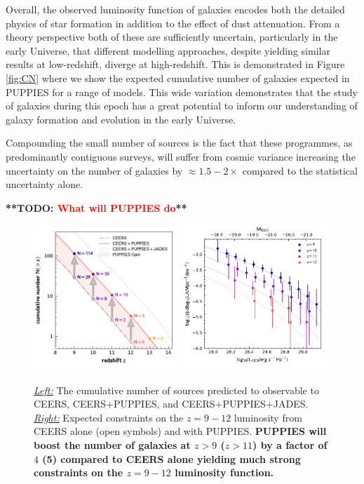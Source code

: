 \documentclass[12pt]{article}
\newcommand{\todo}[1]{\textbf{**TODO: \textcolor{red}{#1}**}}
\begin{document}
Overall, the observed luminosity function of galaxies encodes both the  detailed physics of star formation in addition to the effect of dust attenuation. From a theory perspective both of these are sufficiently uncertain, particularly in the early Universe, that different modelling approaches, despite yielding similar results at low-redshift, diverge at high-redshift. This is demonstrated in Figure \ref{fig:CN} where we show the expected cumulative number of galaxies expected in PUPPIES for a range of models. This wide variation demonstrates that the study of galaxies during this epoch has a great potential to inform our understanding of galaxy formation and evolution in the early Universe.


Compounding the small number of sources is the fact that these programmes, as predominantly contiguous surveys, will suffer from cosmic variance increasing the uncertainty on the number of galaxies by $\approx 1.5-2\times$ compared to the statistical uncertainty alone\cite{2020MNRAS.499.2401T}\cite{2020MNRAS.496..754B}\cite{2008ApJ...676..767T}. 

\todo{What will PUPPIES do}


 \begin{figure}[h!]
    \centering
    \includegraphics[width=0.49\textwidth]{figs/CN_surveys.pdf}
    \includegraphics[width=0.49\textwidth]{figs/LF_evo.pdf}
    \vspace{-5mm}
    \caption{\emph{\underline{Left:}} The cumulative number of sources predicted to observable to CEERS, CEERS+PUPPIES, and CEERS+PUPPIES+JADES.  \emph{\underline{Right:}} Expected constraints on the $z=9-12$ luminosity from CEERS alone (open symbols) and with PUPPIES. \textbf{PUPPIES will boost the number of galaxies at $z>9$ ($z>11$) by a factor of $4$ (5) compared to CEERS alone yielding much strong constraints on the $z=9-12$ luminosity function.}}
    \label{fig:vs_CEERS}
\end{figure}
\end{document}

